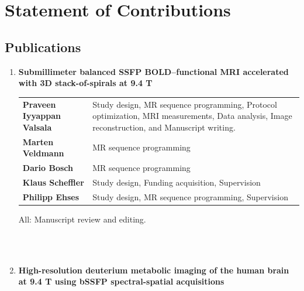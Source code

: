 
\chapter{Statement of Contributions}

\section*{Publications}

\begin{enumerate}
	\item \textbf{Submillimeter balanced SSFP BOLD–functional MRI accelerated with 3D stack-of-spirals at 9.4 T}
	
	\begin{table}[h!]
		\centering
		\begin{tabularx}{\textwidth}{>{\bfseries}m{3.5cm} >{\arraybackslash}X}
			Praveen Iyyappan Valsala & Study design, MR sequence programming, Protocol optimization, MRI measurements, Data analysis, Image reconstruction, and Manuscript writing. \\
			Marten Veldmann & MR sequence programming \\
			Dario Bosch & MR sequence programming \\
			Klaus Scheffler & Study design, Funding acquisition, Supervision \\
			Philipp Ehses & Study design, MR sequence programming, Supervision \\
		\end{tabularx}
	\end{table}
	
	All: Manuscript review and editing.
	
	\\
	\\
	
	\item \textbf{High-resolution deuterium metabolic imaging of the human brain at 9.4 T using bSSFP spectral-spatial acquisitions}
	

\end{enumerate}
